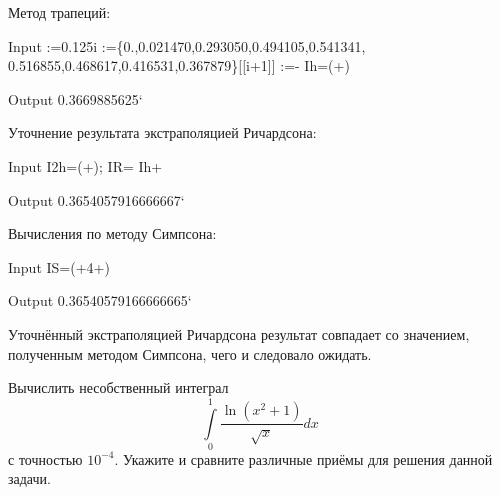 \documentclass[a4paper]{article}
\begin{document}
\begin{sol}
Метод трапеций:
\begin{mmaCell}[morepattern={i_, i, k_},morefunctionlocal={k},moredefined={Ih}]{Input}
  :=0.125i
  :=\{0.,0.021470,0.293050,0.494105,0.541341,
  0.516855,0.468617,0.416531,0.367879\}[[i+1]]
  :=-
  Ih=(+)
\end{mmaCell}
\begin{mmaCell}[]{Output}
  0.3669885625`
\end{mmaCell}
Уточнение результата экстраполяцией Ричардсона:
\begin{mmaCell}[moredefined={I2h, IR, Ih},morefunctionlocal={k}]{Input}
  I2h=(+);
  IR= Ih+
\end{mmaCell}
\begin{mmaCell}[]{Output}
  0.3654057916666667`
\end{mmaCell}
Вычисления по методу Симпсона:
\begin{mmaCell}[moredefined={IS},morefunctionlocal={k}]{Input}
  IS=(+4+)
\end{mmaCell}
\begin{mmaCell}{Output}
  0.36540579166666665`
\end{mmaCell}
Уточнённый экстраполяцией Ричардсона результат совпадает со
значением, полученным методом Симпсона, чего и следовало ожидать.
\end{sol}
\begin{hiProb}[9.10г]
Вычислить несобственный интеграл
\[
	\int\limits_{0}^{1} \frac{\ln \left( x^2+1 \right) }{\sqrt{x} }dx 
\] 
с точностью $10^{-4}$. Укажите и сравните различные приёмы
для решения данной задачи.
\end{hiProb}
\end{document}
